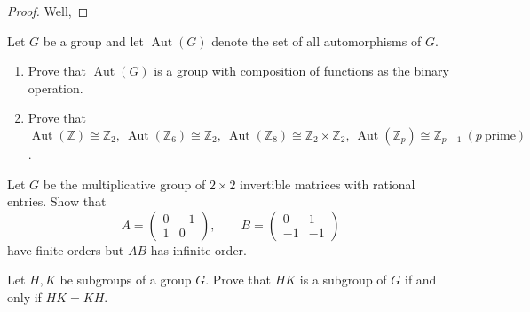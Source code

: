 \documentclass[addpoints,10pt]{exam}
\theoremstyle{plain}
\theoremstyle{definition}
\newtheorem{prob}[thm]{Problem}
\theoremstyle{plain}
\theoremstyle{plain}
\theoremstyle{definition}
\let\oldprob\prob
\let\endoldprob\endprob
\renewenvironment{prob}
  {\begin{singlespace}\oldprob}
  {\endoldprob\end{singlespace}}
\begin{document}
\begin{proof}
Well, 
\end{proof}
\newpage

\begin{prob}
  Let $G$ be a group and let $\operatorname{Aut}(G)$ denote the set of all automorphisms of $G$.
  \begin{enumerate}[label=(\alph*)]
  \item Prove that $\operatorname{Aut}(G)$ is a group with composition of functions as the binary operation.
  \item Prove that $\operatorname{Aut}(\mathbb{Z}) \cong \mathbb{Z}_2,\ 
  \operatorname{Aut}(\mathbb{Z}_6)\cong \mathbb{Z}_2,\
  \operatorname{Aut}(\mathbb{Z}_8)\cong \mathbb{Z}_2 \times \mathbb{Z}_2,\
  \operatorname{Aut}(\mathbb{Z}_p)\cong \mathbb{Z}_{p-1}\ (p\ \text{prime})$.
\end{enumerate}
\end{prob}

\newpage
\setcounter{thm}{7}   %

\begin{prob}
  Let $G$ be the multiplicative group of $2\times 2$ invertible matrices with rational entries. Show that
  \[
  A=\begin{pmatrix}0 & -1 \\ 1 & 0\end{pmatrix},
  \qquad
  B=\begin{pmatrix}0 & 1 \\ -1 & -1\end{pmatrix}
  \]
  have finite orders but $AB$ has infinite order.
\end{prob}

\newpage
\setcounter{thm}{9}   %

\begin{prob}
  Let $H,K$ be subgroups of a group $G$. Prove that $HK$ is a subgroup of $G$ if and only if $HK=KH$.
\end{prob}
\end{document}
